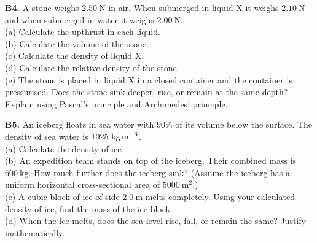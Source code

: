\begin{exercisebox}[11]
\vspace{0.4cm}

\textbf{B4.} A stone weighs $2.50\ \text{N}$ in air.
When submerged in liquid X it weighs $2.10\ \text{N}$
and when submerged in water it weighs $2.00\ \text{N}$.\\[4pt]
(a) Calculate the upthrust in each liquid.\\
(b) Calculate the volume of the stone.\\
(c) Calculate the density of liquid X.\\
(d) Calculate the relative density of the stone.\\
(e) The stone is placed in liquid X in a closed container
and the container is pressurised. Does the stone sink
deeper, rise, or remain at the same depth? Explain
using Pascal's principle and Archimedes' principle.
\hfill{}

\vspace{0.4cm}

\textbf{B5.} An iceberg floats in sea water with
$90\%$ of its volume below the surface. The density
of sea water is $1025\ \text{kg\,m}^{-3}$.\\[4pt]
(a) Calculate the density of ice.\\
(b) An expedition team stands on top of the iceberg.
Their combined mass is $600\ \text{kg}$. How much
further does the iceberg sink? (Assume the iceberg
has a uniform horizontal cross-sectional area of
$5000\ \text{m}^2$.)\\
(c) A cubic block of ice of side $2.0\ \text{m}$
melts completely. Using your calculated density of
ice, find the mass of the ice block.\\
(d) When the ice melts, does the sea level rise,
fall, or remain the same? Justify mathematically.
\hfill{}

\end{exercisebox}
